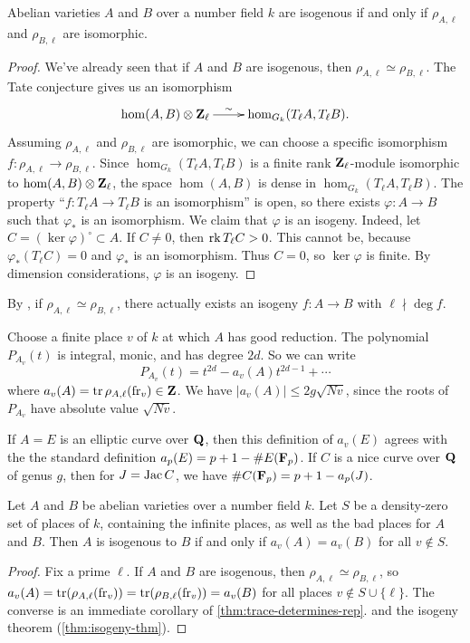 \begin{corollary}\label{thm:isogeny-thm}
Abelian varieties $A$ and $B$ over a number field $k$ are isogenous if and only 
if $\rho_{A,\ell}$ and $\rho_{B,\ell}$ are isomorphic. 
\end{corollary}
\begin{proof}
We've already seen that if $A$ and $B$ are isogenous, then 
$\rho_{A,\ell}\simeq \rho_{B,\ell}$. The Tate conjecture gives us an 
isomorphism 
\[\xymatrix{
  \hom(A,B)\otimes\dZ_\ell \ar[r]^-\sim 
    & \hom_{G_k}(T_\ell A,T_\ell B) \text{.}
}\]
Assuming $\rho_{A,\ell}$ and $\rho_{B,\ell}$ are isomorphic, we can choose 
a specific isomorphism $f:\rho_{A,\ell}\to \rho_{B,\ell}$. Since 
$\hom_{G_k}(T_\ell A,T_\ell B)$ is a finite rank $\mathbf{Z}_\ell$-module isomorphic 
to $\hom(A,B)\otimes \mathbf{Z}_\ell$, the space $\hom(A,B)$ is dense in 
$\hom_{G_k}(T_\ell A,T_\ell B)$. The property ``$f:T_\ell A\to T_\ell B$ is an 
isomorphism'' is open, so there exists $\varphi:A\to B$ such that 
$\varphi_\ast$ is an isomorphism. We claim that $\varphi$ is an isogeny. 
Indeed, let $C=(\ker\varphi)^\circ\subset A$. If $C\ne 0$, then 
$\operatorname{rk} T_\ell C > 0$. This cannot be, because $\varphi_\ast(T_\ell C) = 0$ and 
$\varphi_\ast$ is an isomorphism. Thus $C=0$, so $\ker \varphi$ is finite. By 
dimension considerations, $\varphi$ is an isogeny. 
\end{proof}
By \cite[V.3.2]{fa84}, if $\rho_{A,\ell}\simeq \rho_{B,\ell}$, there actually 
exists an isogeny $f:A\to B$ with $\ell\nmid \deg f$. 

Choose a finite place $v$ of $k$ at which $A$ has good reduction. The 
polynomial $P_{A_v}(t)$ is integral, monic, and has degree $2 d$. So we can 
write 
\[
  P_{A_v}(t) = t^{2 d} - a_v(A) t^{2 d-1} + \cdots 
\]
where $a_v(A)=\operatorname{tr}\rho_{A,\ell}(\mathrm{fr}_v)\in \mathbf{Z}$. We have 
$|a_v(A)|\leqslant 2 g \sqrt{N v}$, since the roots of $P_{A_v}$ have 
absolute value $\sqrt{N v}$. 

If $A=E$ is an elliptic curve over $\mathbf{Q}$, then this definition of $a_v(E)$ 
agrees with the the standard definition $a_p(E)=p+1-\# E(\mathbf{F}_p)$. If 
$C$ is a nice curve over $\mathbf{Q}$ of genus $g$, then for 
$J=\operatorname{Jac} C$, we have $\# C(\mathbf{F}_p) = p+1-a_p(J)$. 

\begin{theorem}
Let $A$ and $B$ be abelian varieties over a number field $k$. Let $S$ be a 
density-zero set of places of $k$, containing the infinite places, as well as 
the bad places for $A$ and $B$. Then $A$ is isogenous to $B$ if and only if 
$a_v(A)=a_v(B)$ for all $v\notin S$. 
\end{theorem}
\begin{proof}
Fix a prime $\ell$. If $A$ and $B$ are isogenous, then 
$\rho_{A,\ell}\simeq \rho_{B,\ell}$, so 
$a_v(A)=\operatorname{tr}(\rho_{A,\ell}(\mathrm{fr}_v))=\operatorname{tr}(\rho_{B,\ell}(\mathrm{fr}_v))=a_v(B)$ 
for all places $v\notin S\cup\{\ell\}$. The converse is an immediate corollary 
of \autoref{thm:trace-determines-rep}. and the isogeny theorem 
(\autoref{thm:isogeny-thm}). 
\end{proof}

